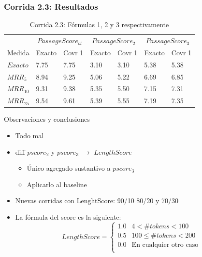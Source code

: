 \begin{frame}
\frametitle{Corrida 2.3: Resultados}
\begin{table}
\centering
\begin{center}

\begin{tabular}{|l | l | l | l | l | l | l |}

& \multicolumn{2}{|c|}{$PassageScore_{bl}$} & \multicolumn{2}{|c|}{$PassageScore_2$} & \multicolumn{2}{|c|}{$PassageScore_3$}\\ 
Medida & Exacto & Covr 1 & Exacto & Covr 1 & Exacto & Covr 1 \\ 
$Exacto$ & 7.75 & 7.75 & 3.10 & 3.10 & 5.38 & 5.38  \\ 
$MRR_{5}$ & 8.94 & 9.25 & 5.06 & 5.22 &  6.69 & 6.85  \\ 
$MRR_{10}$ & 9.31 & 9.38 & 5.35 & 5.50 &  7.15 & 7.31  \\ 
$MRR_{25}$ & 9.54 & 9.61 & 5.39 & 5.55 &  7.19 & 7.35  \\ 
\end{tabular}
\caption{Corrida 2.3: Fórmulas 1, 2 y 3 respectivamente}
\end{center}
\end{table}

Observaciones y conclusiones
\begin{itemize}
  \item Todo mal
  \item diff $pscore_2$ y $pscore_3$ $\rightarrow$ $LengthScore$ 
  \begin{itemize}
    \item Único agregado sustantivo a $pscore_3$
    \item Aplicarlo al baseline
  \end{itemize}
  \item Nuevas corridas con LenghtScore: 90/10 80/20 y 70/30
  \item La fórmula del score es la siguiente:
    \begin{equation*}
        LengthScore = \begin{cases}
                   1.0     & 4 <   \#tokens < 100\\
                   0.5     & 100 \leq \#tokens < 200 \\
                   0.0     & \text{En cualquier otro caso}\\
               \end{cases}
    \end{equation*}
  \end{itemize}

\end{frame}

